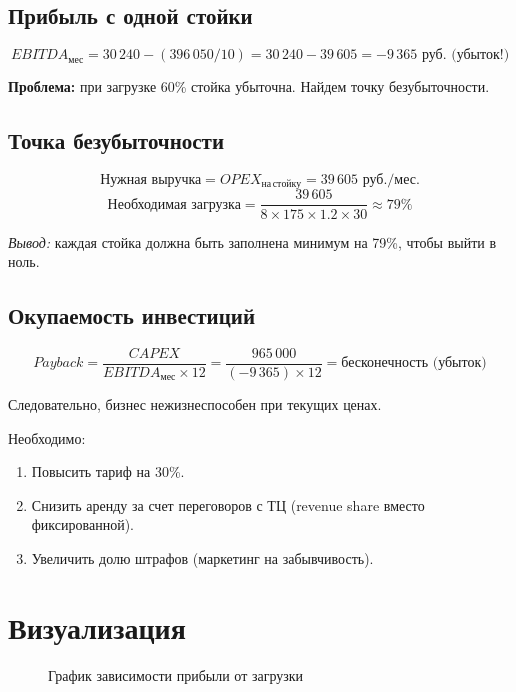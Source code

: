 \documentclass[12pt,a4paper]{article}
\begin{document}
\subsection{Прибыль с одной стойки}
\[
EBITDA_{мес} = 30\,240 - (396\,050 / 10) = 30\,240 - 39\,605 = -9\,365 \text{ руб. (убыток!)}
\]

\textbf{Проблема:} при загрузке 60\% стойка убыточна. Найдем точку безубыточности.

\subsection{Точка безубыточности}
\[
\text{Нужная выручка} = OPEX_{на\,стойку} = 39\,605 \text{ руб./мес.}
\]
\[
\text{Необходимая загрузка} = \frac{39\,605}{8 \times 175 \times 1.2 \times 30} \approx 79\%
\]

\textit{Вывод:} каждая стойка должна быть заполнена минимум на 79\%, чтобы выйти в ноль.

\subsection{Окупаемость инвестиций}
\[
Payback = \frac{CAPEX}{EBITDA_{мес} \times 12} = \frac{965\,000}{(-9\,365) \times 12} = \text{бесконечность (убыток)}
\]

Следовательно, бизнес нежизнеспособен при текущих ценах.

Необходимо:
\begin{enumerate}
    \item Повысить тариф на 30\%.
    \item Снизить аренду за счет переговоров с ТЦ (revenue share вместо фиксированной).
    \item Увеличить долю штрафов (маркетинг на забывчивость).
\end{enumerate}

\section{Визуализация }
\begin{figure}[H]
\centering
{}
\caption{График зависимости прибыли от загрузки}
\end{figure}
\end{document}
